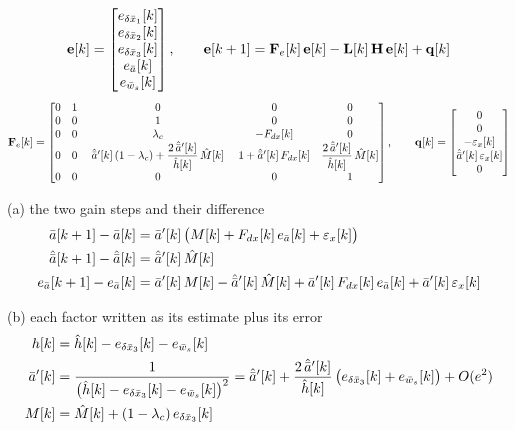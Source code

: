 \[
\mathbf{e}[k] = \begin{bmatrix} e_{\delta\bar{x}_1}[k] \\ e_{\delta\bar{x}_2}[k] \\ e_{\delta\bar{x}_3}[k] \\ e_{\bar{a}}[k] \\ e_{\bar{w}_s}[k] \end{bmatrix},
\qquad
\mathbf{e}[k+1] = \mathbf{F}_e[k]\,\mathbf{e}[k] - \mathbf{L}[k]\,\mathbf{H}\,\mathbf{e}[k] + \mathbf{q}[k]
\]
\[
\mathbf{F}_e[k] =
\begin{bmatrix}
0 & 1 & 0 & 0 & 0 \\
0 & 0 & 1 & 0 & 0 \\
0 & 0 & \lambda_c & -F_{dx}[k] & 0 \\
0 & 0 & \;\hat{\bar{a}}'[k]\,(1-\lambda_c) + \dfrac{2\,\hat{\bar{a}}'[k]}{\hat{h}[k]}\,\hat{M}[k]\; & 1 + \hat{\bar{a}}'[k]\,F_{dx}[k] & \dfrac{2\,\hat{\bar{a}}'[k]}{\hat{h}[k]}\,\hat{M}[k] \\
0 & 0 & 0 & 0 & 1
\end{bmatrix},
\qquad
\mathbf{q}[k] = \begin{bmatrix} 0 \\ 0 \\ -\varepsilon_x[k] \\ \hat{\bar{a}}'[k]\,\varepsilon_x[k] \\ 0 \end{bmatrix}
\]

\clearpage
{}

\noindent (a) the two gain steps and their difference
\[
\begin{aligned}
\bar{a}[k+1] - \bar{a}[k] &= \bar{a}'[k]\,\big(M[k] + F_{dx}[k]\,e_{\bar{a}}[k] + \varepsilon_x[k]\big) \\
\hat{\bar{a}}[k+1] - \hat{\bar{a}}[k] &= \hat{\bar{a}}'[k]\,\hat{M}[k] \\
e_{\bar{a}}[k+1] - e_{\bar{a}}[k] &= \bar{a}'[k]\,M[k] - \hat{\bar{a}}'[k]\,\hat{M}[k] + \bar{a}'[k]\,F_{dx}[k]\,e_{\bar{a}}[k] + \bar{a}'[k]\,\varepsilon_x[k]
\end{aligned}
\]

\noindent (b) each factor written as its estimate plus its error
\[
\begin{aligned}
h[k] &= \hat{h}[k] - e_{\delta\bar{x}_3}[k] - e_{\bar{w}_s}[k] \\
\bar{a}'[k] &= \frac{1}{\big(\hat{h}[k] - e_{\delta\bar{x}_3}[k] - e_{\bar{w}_s}[k]\big)^{2}}
= \hat{\bar{a}}'[k] + \frac{2\,\hat{\bar{a}}'[k]}{\hat{h}[k]}\,\big(e_{\delta\bar{x}_3}[k] + e_{\bar{w}_s}[k]\big) + O(e^{2}) \\
M[k] &= \hat{M}[k] + (1-\lambda_c)\,e_{\delta\bar{x}_3}[k]
\end{aligned}
\]

